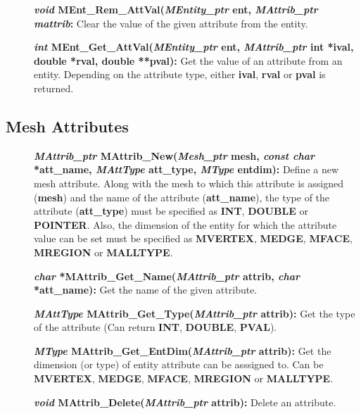 \documentclass[12pt]{article}
\begin{document}
\begin{description}
\item[]\textbf{\textit{void} MEnt\_Rem\_AttVal(\textit{MEntity\_ptr}
    ent, \textit{MAttrib\_ptr mattrib}:} Clear the value of the given
  attribute from the entity.
    
\item[]\textbf{\textit{int} MEnt\_Get\_AttVal(\textit{MEntity\_ptr}
    ent, \textit{MAttrib\_ptr} int *ival, double *rval, double
    **pval):} Get the value of an attribute from an entity.  Depending
  on the attribute type, either \textbf{ival}, \textbf{rval} or
  \textbf{pval} is returned.

\end{description}

\newpage
\subsection{Mesh Attributes}

\begin{description}
  
\item[]\textbf{\textit{MAttrib\_ptr} MAttrib\_New(\textit{Mesh\_ptr}
    mesh, \textit{const char} *att\_name, \textit{MAttType} att\_type,
    \textit{MType} entdim):} Define a new mesh attribute. Along with
  the mesh to which this attribute is assigned (\textbf{mesh}) and the
  name of the attribute (\textbf{att\_name}), the type of the
  attribute (\textbf{att\_type}) must be specified as \textbf{INT},
  \textbf{DOUBLE} or \textbf{POINTER}. Also, the dimension of the entity
    for which the attribute value can be set must be specified as
    \textbf{MVERTEX}, \textbf{MEDGE}, \textbf{MFACE}, \textbf{MREGION}
    or \textbf{MALLTYPE}.

\item[]\textbf{\textit{char} *MAttrib\_Get\_Name(\textit{MAttrib\_ptr}
    attrib, \textit{char} *att\_name):} Get the name of the given attribute.
  
\item[]\textbf{\textit{MAttType}
    MAttrib\_Get\_Type(\textit{MAttrib\_ptr} attrib):} Get the type of
  the attribute (Can return \textbf{INT}, \textbf{DOUBLE},
  \textbf{PVAL}).
  
\item[]\textbf{\textit{MType}
    MAttrib\_Get\_EntDim(\textit{MAttrib\_ptr} attrib):} Get the
  dimension (or type) of entity attribute can be asssigned to. Can be
  \textbf{MVERTEX}, \textbf{MEDGE}, \textbf{MFACE}, \textbf{MREGION}
  or \textbf{MALLTYPE}.
  
\item[]\textbf{\textit{void} MAttrib\_Delete(\textit{MAttrib\_ptr}
    attrib):} Delete an attribute.

\end{description}
\end{document}
